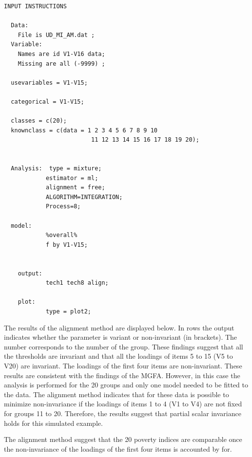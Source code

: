 \documentclass[]{book}
\begin{document}
\begin{verbatim}
INPUT INSTRUCTIONS

  Data:
    File is UD_MI_AM.dat ;
  Variable:
    Names are id V1-V16 data;
    Missing are all (-9999) ;

  usevariables = V1-V15;

  categorical = V1-V15;

  classes = c(20);
  knownclass = c(data = 1 2 3 4 5 6 7 8 9 10
                         11 12 13 14 15 16 17 18 19 20);


  Analysis:  type = mixture;
            estimator = ml;
            alignment = free;
            ALGORITHM=INTEGRATION;
            Process=8;

  model:
            %overall%
            f by V1-V15;


    output:
            tech1 tech8 align;

    plot:
            type = plot2;
\end{verbatim}

The results of the alignment method are displayed below. In rows the output indicates whether the parameter is variant or non-invariant (in brackets). The number corresponds to the number of the group. These findings suggest that all the thresholds are invariant and that all the loadings of items 5 to 15 (V5 to V20) are invariant. The loadings of the first four items are non-invariant. These results are consistent with the findings of the MGFA. However, in this case the analysis is performed for the 20 groups and only one model needed to be fitted to the data. The alignment method indicates that for these data is possible to minimize non-invariance if the loadings of items 1 to 4 (V1 to V4) are not fixed for groups 11 to 20. Therefore, the results suggest that partial scalar invariance holds for this simulated example.

The alignment method suggest that the 20 poverty indices are comparable once the non-invariance of the loadings of the first four items is accounted by for.
\end{document}
